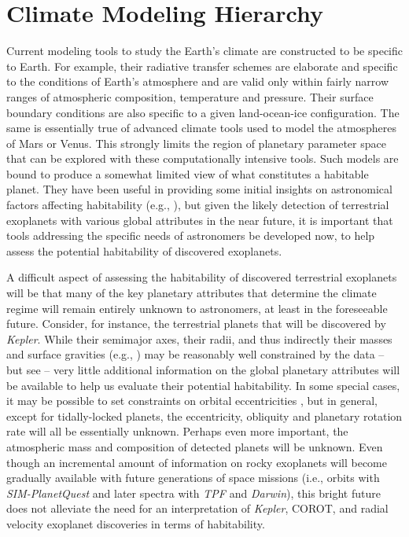 \section{Climate Modeling Hierarchy}
\label{hab_sec:model}

Current modeling tools to study the Earth's climate are constructed to
be specific to Earth.  For example, their radiative transfer schemes
are elaborate and specific to the conditions of Earth's atmosphere and
are valid only within fairly narrow ranges of atmospheric composition,
temperature and pressure. Their surface boundary conditions are also
specific to a given land-ocean-ice configuration.  The same is
essentially true of advanced climate tools used to model the
atmospheres of Mars or Venus. This strongly limits the region of
planetary parameter space that can be explored with these
computationally intensive tools.  Such models are bound to produce a
somewhat limited view of what constitutes a habitable planet.  They
have been useful in providing some initial insights on astronomical
factors affecting habitability (e.g.,
\citealt{williams+pollard2002,williams+pollard2003}), but given the
likely detection of terrestrial exoplanets with various global
attributes in the near future, it is important that tools addressing
the specific needs of astronomers be developed now, to help assess the
potential habitability of discovered exoplanets.

A difficult aspect of assessing the habitability of discovered
terrestrial exoplanets will be that many of the key planetary
attributes that determine the climate regime will remain entirely
unknown to astronomers, at least in the foreseeable future. Consider,
for instance, the terrestrial planets that will be discovered by {\it
Kepler}. {While their semimajor axes, their radii,} and thus
indirectly their masses and surface gravities (e.g.,
\citealt{valencia_et_al2006,valencia_et_al2007,fortney_et_al2007,adams_et_al2007})
may be reasonably well constrained by the data -- but see
\citet{seager_et_al2007} -- very little additional information on the
global planetary attributes will be available to help us evaluate
their potential habitability. In some special cases, it may be
possible to set constraints on orbital eccentricities
\citep{barnes2007,ford_et_al2008}, but in general, except for
tidally-locked planets, the eccentricity, obliquity and planetary
rotation rate will all be essentially unknown. Perhaps even more
important, the atmospheric mass and composition of detected planets
will be unknown. Even though an incremental amount of information on
rocky exoplanets will become gradually available with future
generations of space missions (i.e., orbits with {\it SIM-PlanetQuest}
and later spectra with {\it TPF} and {\it Darwin}), this bright future
does not alleviate the need for an interpretation of {\it Kepler},
COROT, and radial velocity exoplanet discoveries in terms of
habitability.

